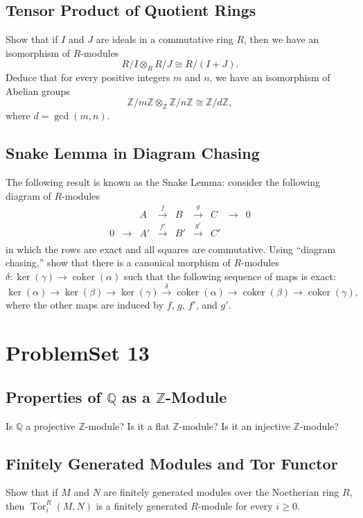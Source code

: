 \documentclass[lang=cn,11pt]{template}
\begin{document}
\section{Tensor Product of Quotient Rings}
Show that if \( I \) and \( J \) are ideals in a commutative ring \( R \), then we have an isomorphism of \( R \)-modules
\[
R/I \otimes_R R/J \cong R/(I + J).
\]
Deduce that for every positive integers \( m \) and \( n \), we have an isomorphism of Abelian groups
\[
\mathbb{Z}/m\mathbb{Z} \otimes_{\mathbb{Z}} \mathbb{Z}/n\mathbb{Z} \cong \mathbb{Z}/d\mathbb{Z},
\]
where \( d = \gcd(m, n) \).

\section{Snake Lemma in Diagram Chasing}
The following result is known as the Snake Lemma: consider the following diagram of \( R \)-modules
\[
\begin{array}{ccccccccc}
& & A & \xrightarrow{f} & B & \xrightarrow{g} & C & \rightarrow & 0 \\
0 & \rightarrow & A' & \xrightarrow{f'} & B' & \xrightarrow{g'} & C' \\
\end{array}
\]
in which the rows are exact and all squares are commutative. Using “diagram chasing,” show that there is a canonical morphism of \( R \)-modules \( \delta : \ker(\gamma) \rightarrow \operatorname{coker}(\alpha) \) such that the following sequence of maps is exact:
\[
\ker(\alpha) \rightarrow \ker(\beta) \rightarrow \ker(\gamma) \xrightarrow{\delta} \operatorname{coker}(\alpha) \rightarrow \operatorname{coker}(\beta) \rightarrow \operatorname{coker}(\gamma),
\]
where the other maps are induced by \( f \), \( g \), \( f' \), and \( g' \).






\chapter{ProblemSet 13}

\section{Properties of \( \mathbb{Q} \) as a \( \mathbb{Z} \)-Module}
Is \( \mathbb{Q} \) a projective \( \mathbb{Z} \)-module? Is it a flat \( \mathbb{Z} \)-module? Is it an injective \( \mathbb{Z} \)-module?

\section{Finitely Generated Modules and Tor Functor}
Show that if \( M \) and \( N \) are finitely generated modules over the Noetherian ring \( R \), then \( \operatorname{Tor}^R_i(M, N) \) is a finitely generated \( R \)-module for every \( i \geq 0 \).
\end{document}
